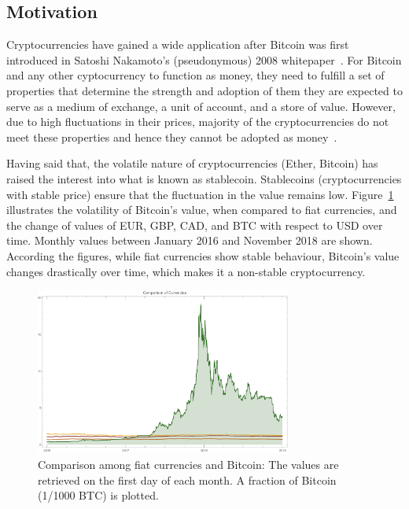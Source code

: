 
\subsection{Motivation} %
Cryptocurrencies have gained a wide application after Bitcoin was first introduced in Satoshi Nakamoto’s (pseudonymous) 2008 whitepaper~\cite{nakamoto2008bitcoin}. For Bitcoin and any other cyptocurrency to function as money, they need to fulfill a set of properties that determine the strength and adoption of them \ie they are expected to serve as a medium of exchange, a unit of account, and a store of value. However, due to high fluctuations in their prices, majority of the cryptocurrencies do not meet these properties and hence they cannot be adopted as money~\cite{overview}.

Having said that, the volatile nature of cryptocurrencies (\eg Ether, Bitcoin) has raised the interest into what is known as stablecoin. Stablecoins (\ie cryptocurrencies with stable price) ensure that the fluctuation in the value remains low. Figure~\ref{fig:btcandfiat} illustrates the volatility of Bitcoin's value, when compared to fiat currencies, and the change of values of EUR, GBP, CAD, and BTC with respect to USD over time. Monthly values between January 2016 and November 2018 are shown. According the figures, while fiat currencies show stable behaviour, Bitcoin's value changes drastically over time, which makes it a non-stable cryptocurrency.

\begin{figure}[!htb]
	\centering
	\includegraphics[width=0.75\textwidth]{figures/allCurrencies.pdf}
	\caption{\label{fig:btcandfiat}Comparison among fiat currencies and Bitcoin: The values are retrieved on the first day of each month. A fraction of Bitcoin (1/1000 BTC) is plotted.}
\end{figure}


